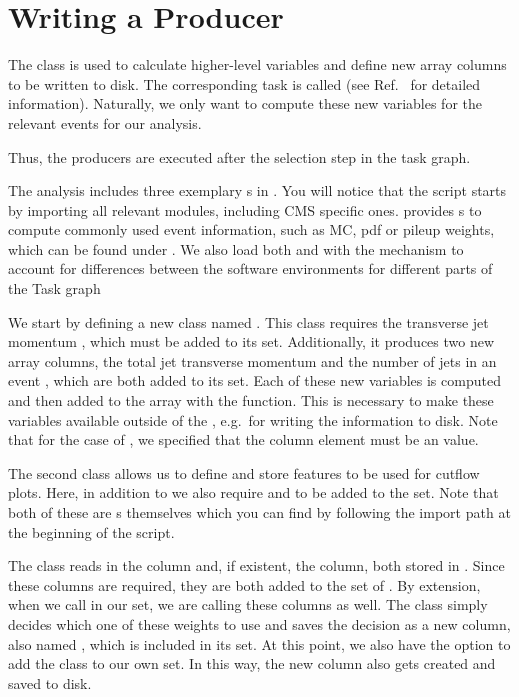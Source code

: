 \section{Writing a Producer}\label{sec:producer}

The  class is used to calculate higher-level variables and define new array columns to be written to disk.
The corresponding task is called  (see Ref.~\cite{cf_repo} for detailed information).
Naturally, we only want to compute these new variables for the relevant events for our analysis.

Thus, the producers are executed after the selection step in the task graph. 


The  analysis includes three exemplary s in .
You will notice that the script starts by importing all relevant modules, including CMS specific ones.
\columnflow provides s to compute commonly used event information, such as MC, pdf or pileup weights, which can be found under .
We also load both  and  with the  mechanism to account for differences between the software environments for different parts of the Task graph

We start by defining a new  class named .
This class requires the transverse jet momentum , which must be added to its  set.
Additionally, it produces two new array columns, the total jet transverse momentum  and the number of jets in an event , which are both added to its  set.
Each of these new variables is computed and then added to the  array with the  function.
This is necessary to make these variables available outside of the , e.g.\ for writing the information to disk.
Note that for the case of , we specified that the column element must be an  value.

The second  class  allows us to define and store features to be used for cutflow plots. Here, in addition to  we also require  and  to be added to the  set. Note that both of these are s themselves which you can find by following the import path at the beginning of the script.

The   class  reads in the  column and, if existent, the  column, both stored in . Since these columns are required, they are both added to the  set of . By extension, when we call  in our  set, we are calling these columns as well. The  class simply decides which one of these weights to use and saves the decision as a new column, also named , which is included in its  set. At this point, we also have the option to add the  class to our own  set. In this way, the new column also gets created and saved to disk.

